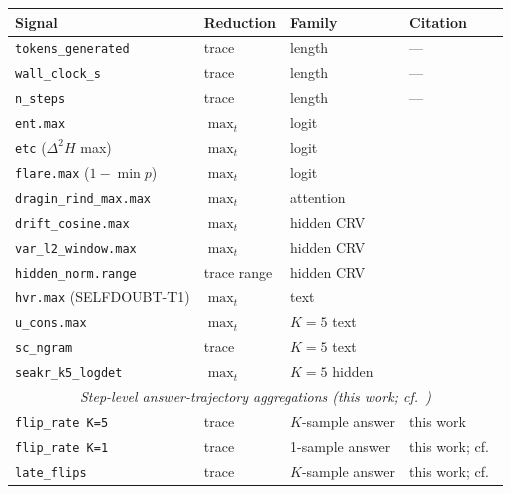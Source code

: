 \documentclass[11pt]{article}
\begin{document}
\begin{table}[t]
\centering\small
\begin{tabular}{@{}llll@{}}
\toprule
\textbf{Signal} & \textbf{Reduction} & \textbf{Family} & \textbf{Citation} \\
\midrule
\texttt{tokens\_generated}      & trace       & length & --- \\
\texttt{wall\_clock\_s}         & trace       & length & --- \\
\texttt{n\_steps}               & trace       & length & --- \\
\midrule
\texttt{ent.max}                & $\max_t$    & logit  & \citep{Lin_GeneratingConfidence} \\
\texttt{etc} ($\Delta^2 H$ max) & $\max_t$    & logit  & \citep{Li_ETC} \\
\texttt{flare.max} ($1{-}\min p$) & $\max_t$  & logit  & \citep{Jiang_FLARE} \\
\midrule
\texttt{dragin\_rind\_max.max}  & $\max_t$    & attention & \citep{Su_DRAGIN} \\
\midrule
\texttt{drift\_cosine.max}      & $\max_t$    & hidden CRV & \citep{Chen_INSIDE} \\
\texttt{var\_l2\_window.max}    & $\max_t$    & hidden CRV & \citep{Chen_INSIDE} \\
\texttt{hidden\_norm.range}     & trace range & hidden CRV & \citep{Azaria_Mitchell_InternalState} \\
\midrule
\texttt{hvr.max} (SELFDOUBT-T1) & $\max_t$    & text   & \citep{Kadavath_SelfDoubt} \\
\midrule
\texttt{u\_cons.max}            & $\max_t$    & $K{=}5$ text & \citep{Manakul_SelfCheckGPT} \\
\texttt{sc\_ngram}              & trace       & $K{=}5$ text & \citep{Manakul_SelfCheckGPT} \\
\texttt{seakr\_k5\_logdet}      & $\max_t$    & $K{=}5$ hidden & \citep{Yao_SeaKR} \\
\midrule
\multicolumn{4}{c}{\textit{Step-level answer-trajectory aggregations (this work; cf.\ \citealp{Datta_DecideEarlyExplainLater})}} \\
\midrule
\texttt{flip\_rate K=5}         & trace       & $K$-sample answer & this work \\
\texttt{flip\_rate K=1}         & trace       & 1-sample answer & this work; cf.\ \citealp{Datta_DecideEarlyExplainLater} \\
\texttt{late\_flips}            & trace       & $K$-sample answer & this work; cf.\ \citealp{Chen_DynamicInstabilityLLMReasoning} \\

\end{tabular}
\end{table}
\end{document}
